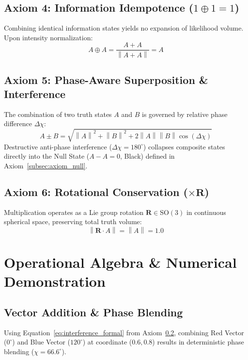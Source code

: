 \documentclass[12pt, a4paper]{article}
\providecommand{\norm}[1]{\left\lVert#1\right\rVert}
\begin{document}
\subsection{Axiom 4: Information Idempotence ($1 \oplus 1 = 1$)}
\label{subsec:axiom_idempotence}
Combining identical information states yields no expansion of likelihood volume. Upon intensity normalization:
\begin{equation}
    A \oplus A = \frac{A + A}{\norm{A + A}} = A
    \label{eq:idempotence_formal}
\end{equation}

\subsection{Axiom 5: Phase-Aware Superposition \& Interference}
\label{subsec:axiom_interference}
The combination of two truth states $A$ and $B$ is governed by relative phase difference $\Delta\chi$:
\begin{equation}
    A \pm B = \sqrt{\norm{A}^2 + \norm{B}^2 + 2\norm{A}\norm{B}\cos(\Delta\chi)}
    \label{eq:interference_formal}
\end{equation}
Destructive anti-phase interference ($\Delta\chi = 180^\circ$) collapses composite states directly into the Null State ($A - A = 0$, Black) defined in Axiom~\ref{subsec:axiom_null}.

\subsection{Axiom 6: Rotational Conservation (\texorpdfstring{$\times \mathbf{R}$}{x R})}
\label{subsec:axiom_rotation}
Multiplication operates as a Lie group rotation $\mathbf{R} \in \mathrm{SO}(3)$ in continuous spherical space, preserving total truth volume:
\begin{equation}
    \norm{\mathbf{R} \cdot A} = \norm{A} = 1.0
\end{equation}

\section{Operational Algebra \& Numerical Demonstration}

\subsection{Vector Addition \& Phase Blending}
Using Equation~\eqref{eq:interference_formal} from Axiom~\ref{subsec:axiom_interference}, combining Red Vector ($0^\circ$) and Blue Vector ($120^\circ$) at coordinate ($0.6, 0.8$) results in deterministic phase blending ($\chi = 66.6^\circ$).
\end{document}
